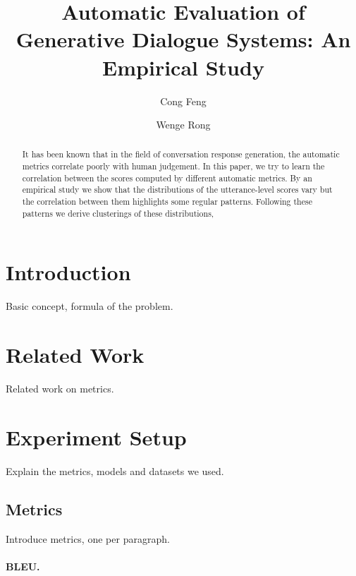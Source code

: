 \documentclass[runningheads]{llncs}
\begin{document}
\title{Automatic Evaluation of Generative Dialogue Systems: An Empirical Study}


\author{Cong Feng \and Wenge Rong}



\maketitle

\begin{abstract}
    It has been known that in the field of conversation response generation, the automatic metrics correlate poorly with human judgement.
    In this paper, we try to learn the correlation between the scores computed by different automatic metrics.
    By an empirical study we show that the distributions of the utterance-level scores vary but the correlation between them highlights some regular patterns.
    Following these patterns we derive clusterings of these distributions,
\end{abstract}


\section{Introduction}
Basic concept, formula of the problem.

\section{Related Work}
Related work on metrics.

\section{Experiment Setup}
Explain the metrics, models and datasets we used.

\subsection{Metrics}
Introduce metrics, one per paragraph.
\paragraph{BLEU.}
\end{document}

